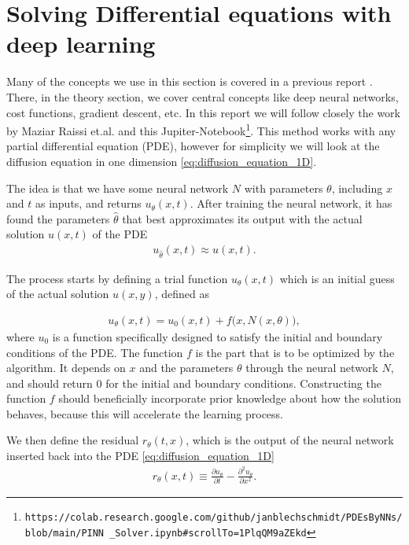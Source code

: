 \documentclass[12pt]{extarticle}
\begin{document}
\section{Solving Differential equations with deep learning}
Many of the concepts we use in this section is covered in a previous report \cite{project2}. There, in the theory section, we cover central concepts like deep neural networks, cost functions, gradient descent, etc. In this report we will follow closely the work by Maziar Raissi et.al. \cite{raissi2017physics} and this Jupiter-Notebook\footnote{\texttt{https://colab.research.google.com/github/janblechschmidt/PDEsByNNs/blob/main/PINN \_Solver.ipynb\#scrollTo=1PlqQM9aZEkd}}. This method works with any partial differential equation (PDE), however for simplicity we will look at the diffusion equation in one dimension \eqref{eq:diffusion_equation_1D}. 

The idea is that we have some neural network $N$ with parameters $\theta$, including $x$ and $t$ as inputs, and returns $u_{\theta}(x,t)$. After training the neural network, it has found the parameters $\hat{\theta}$ that best approximates its output with the actual solution $u(x,t)$ of the PDE
\begin{align*}
	u_{\hat{\theta}} (x, t) \approx u(x, t).
\end{align*}

The process starts by defining a trial function $u_{\theta}(x,t)$ which is an initial guess of the actual solution $u(x,y)$, defined as

\begin{align}
	u_{\theta}(x,t) = u_0(x, t) + f\big(x, N(x,\theta)\big),
	\label{eq:NN_model}
\end{align}
where $u_0$ is a function specifically designed to satisfy the initial and boundary conditions of the PDE. The function $f$ is the part that is to be optimized by the algorithm. It depends on $x$ and the parameters $\theta$ through the neural network $N$, and should return 0 for the initial and boundary conditions. Constructing the function $f$ should beneficially incorporate prior knowledge about how the solution behaves, because this will accelerate the learning process.

\par We then define the residual $r_\theta(t, x)$, which is the output of the neural network inserted back into the PDE \eqref{eq:diffusion_equation_1D}
\begin{align}
	r_\theta(x, t) \equiv \frac{\partial u_\theta}{\partial t} - \frac{\partial^2 u_\theta}{\partial x^2}.
	\label{eq:residual}
\end{align}
\end{document}
